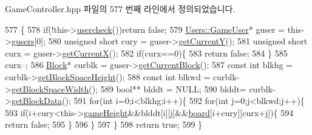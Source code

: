 Game\+Controller.\+hpp 파일의 577 번째 라인에서 정의되었습니다.


\begin{DoxyCode}
577                               \{
578                  \textcolor{keywordflow}{if}(!this->\hyperlink{class_tetris_1_1_game_controller_ab96e22daad51119b35cbee8cfb7385ef}{usercheck}())\textcolor{keywordflow}{return} \textcolor{keyword}{false};
579                 \hyperlink{class_tetris_1_1_users_1_1_game_user}{Users::GameUser}* guser = this->\hyperlink{class_tetris_1_1_game_controller_a1a31d3a933daad6d95e20458eea2900e}{gusers}[0];
580                 \textcolor{keywordtype}{unsigned} \textcolor{keywordtype}{short} cury = guser->\hyperlink{class_tetris_1_1_users_1_1_game_user_af5bd7ff0b575af1b42b093488cff97e2}{getCurrentY}();
581                 \textcolor{keywordtype}{unsigned} \textcolor{keywordtype}{short} curx = guser->\hyperlink{class_tetris_1_1_users_1_1_game_user_ad25eace96bd27ae6df4a0c0d506be730}{getCurrentX}();
582                 \textcolor{keywordflow}{if}(curx==0)\{
583                     \textcolor{keywordflow}{return} \textcolor{keyword}{false};
584                 \}
585                 curx--;
586                 \hyperlink{class_tetris_1_1_block}{Block}* curblk = guser->\hyperlink{class_tetris_1_1_users_1_1_game_user_a3d4bcc74d518c28356012f8a42b85896}{getCurrentBlock}();
587                 \textcolor{keyword}{const} \textcolor{keywordtype}{int} blkhg = curblk->\hyperlink{class_tetris_1_1_block_a5301977e32c03aaf122fa289fcba77ba}{getBlockSpaceHeight}();
588                 \textcolor{keyword}{const} \textcolor{keywordtype}{int} blkwd = curblk->\hyperlink{class_tetris_1_1_block_ac390e14de476582300d815d9054ed9bd}{getBlockSpaceWidth}();
589                  \textcolor{keywordtype}{bool}** blddt = NULL;
590              blddt= curblk->\hyperlink{class_tetris_1_1_block_a9bd2c3d6ccacff9a5f56f72336ba324f}{getBlockData}();
591              \textcolor{keywordflow}{for}(\textcolor{keywordtype}{int} i=0;i<blkhg;i++)\{
592                     \textcolor{keywordflow}{for}(\textcolor{keywordtype}{int} j=0;j<blkwd;j++)\{
593                         \textcolor{keywordflow}{if}(i+cury<this->\hyperlink{class_tetris_1_1_game_controller_a8e3adc647ed382de0ff541417bea9b33}{gameHeight}&&blddt[i][j]&&\hyperlink{class_tetris_1_1_game_controller_a7725b6cec9459a6bffaa3e29dd1c5196}{board}[i+cury][curx+j])\{
594                             \textcolor{keywordflow}{return} \textcolor{keyword}{false};
595                         \}
596                     \}
597                 \}
598                 \textcolor{keywordflow}{return} \textcolor{keyword}{true};
599             \}
\end{DoxyCode}
